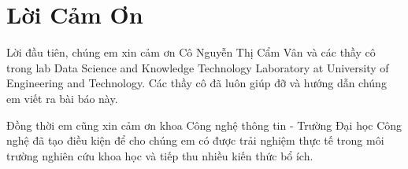 \chapter*{Lời Cảm Ơn}

Lời đầu tiên, chúng em xin cảm ơn Cô Nguyễn Thị Cẩm Vân và các thầy cô trong lab  Data Science and Knowledge Technology Laboratory at University of Engineering and Technology. Các thầy cô đã luôn giúp đỡ và hướng dẫn chúng em viết ra bài báo này.




Đồng thời em cũng xin cảm ơn khoa Công nghệ thông tin - Trường Đại học Công nghệ đã tạo điều kiện để cho chúng em có được trải nghiệm thực tế trong môi trường nghiên cứu khoa học và tiếp thu nhiều kiến thức bổ ích.